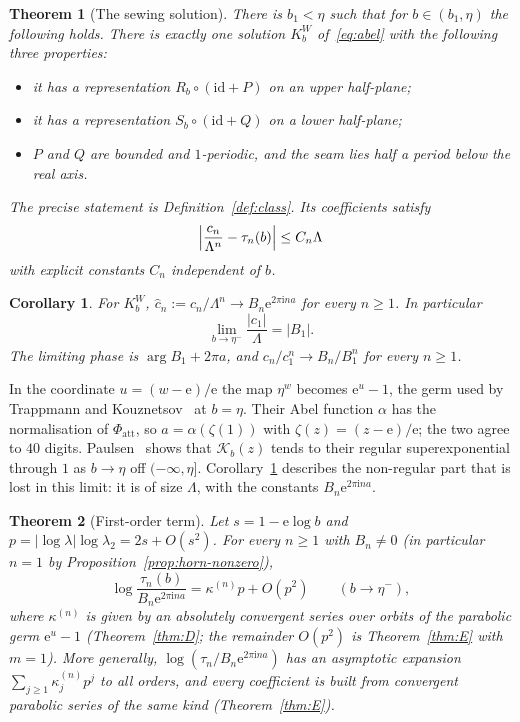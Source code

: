 \documentclass[11pt]{amsart}
\newtheorem{corollary}[theorem]{Corollary}
\newtheorem{maintheorem}{Theorem}
\theoremstyle{definition}
\newcommand{\Rr}{R}
\newcommand{\Kk}{K}
\newcommand{\eee}{\mathrm{e}}
\newcommand{\ii}{\mathrm{i}}
\begin{document}
\begin{maintheorem}[The sewing solution]\label{mthm:B}
There is $b_1<\eta$ such that for $b\in(b_1,\eta)$ the following holds.  There
is exactly one solution $\Kk^W_b$ of~\eqref{eq:abel} with the following three
properties:
\begin{itemize}
\item it has a representation $\Rr_b\circ(\mathrm{id}+P)$ on an upper half-plane;
\item it has a representation $S_b\circ(\mathrm{id}+Q)$ on a lower half-plane;
\item $P$ and $Q$ are bounded and $1$-periodic, and the seam lies half a period
  below the real axis.
\end{itemize}
The precise statement is Definition~\ref{def:class}.  Its coefficients satisfy
\[
 \Bigl|\frac{c_n}{\Lambda^n}-\tau_n(b)\Bigr|\le C_n\Lambda
\]
with explicit constants $C_n$ independent of $b$.
\end{maintheorem}

\begin{corollary}\label{cor:limits}
For $\Kk^W_b$, $\hat c_n:=c_n/\Lambda^n\to B_n\eee^{2\pi\ii na}$ for every $n\ge1$.
In particular
\[
 \lim_{b\to\eta^-}\frac{|c_1|}{\Lambda}=|B_1|.
\]
The limiting phase is $\arg B_1+2\pi a$, and
$c_n/c_1^n\to B_n/B_1^n$ for every $n\ge1$.
\end{corollary}

In the coordinate $u=(w-\eee)/\eee$ the map $\eta^w$ becomes $\eee^u-1$, the
germ used by Trappmann and Kouznetsov~\cite{KouznetsovTrappmann2012} at
$b=\eta$.  Their Abel function $\alpha$ has the normalisation of
$\Phi_{\mathrm{att}}$, so $a=\alpha(\zeta(1))$ with $\zeta(z)=(z-\eee)/\eee$; the two
agree to $40$ digits.  Paulsen~\cite[Prop.~1]{Paulsen2026} shows that $\mathcal K_b(z)$
tends to their regular superexponential through $1$ as $b\to\eta$ off
$(-\infty,\eta]$.  Corollary~\ref{cor:limits} describes the non-regular part that
is lost in this limit: it is of size $\Lambda$, with the constants $B_n\eee^{2\pi\ii na}$.

\begin{maintheorem}[First-order term]\label{mthm:D}
Let $s=1-\eee\log b$ and $p=|\log\lambda|\log\lambda_2=2s+O(s^2)$.  For every
$n\ge1$ with $B_n\ne0$ (in particular $n=1$ by Proposition~\ref{prop:horn-nonzero}),
\[
 \log\frac{\tau_n(b)}{B_n\eee^{2\pi\ii na}}=\kappa^{(n)}p+O(p^{2})\qquad(b\to\eta^-),
\]
where $\kappa^{(n)}$ is given by an absolutely convergent series over orbits of
the parabolic germ $\eee^u-1$ (Theorem~\ref{thm:D}; the remainder $O(p^2)$ is
Theorem~\ref{thm:E} with $m=1$).  More generally,
$\log(\tau_n/B_n\eee^{2\pi\ii na})$ has an asymptotic expansion
$\sum_{j\ge1}\kappa^{(n)}_jp^j$ to all orders, and every coefficient is built from
convergent parabolic series of the same kind (Theorem~\ref{thm:E}).
\end{maintheorem}
\end{document}
